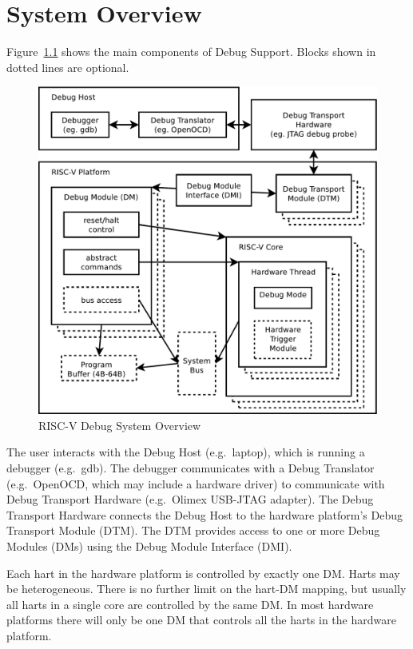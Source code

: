 \chapter{System Overview} \label{overview}

Figure~\ref{fig:overview} shows the main components of Debug Support.
Blocks shown in dotted lines are optional. 

\begin{figure}
   \centering
   \includegraphics[width=\textwidth]{fig/overview-eps-converted-to.pdf}
   \caption{RISC-V Debug System Overview}
   \label{fig:overview}
\end{figure}

The user interacts with the Debug Host (e.g.\ laptop), which is running a
debugger (e.g.\ gdb).  The debugger communicates with a Debug Translator (e.g.\ 
OpenOCD, which may include a hardware driver) to communicate with Debug
Transport Hardware (e.g.\ Olimex USB-JTAG adapter).
The Debug Transport Hardware connects the Debug Host to the hardware platform's Debug
Transport Module (DTM).  The DTM provides access to one or more Debug Modules
(DMs) using the Debug Module Interface (DMI).

Each hart in the hardware platform is controlled by exactly one DM. Harts may be
heterogeneous. There is no further limit on the hart-DM mapping, but usually
all harts in a single core are controlled by the same DM. In most hardware platforms there
will only be one DM that controls all the harts in the hardware platform.

